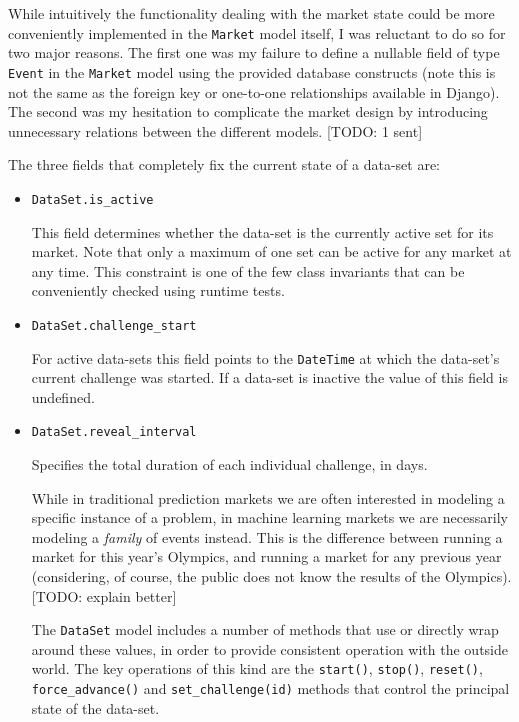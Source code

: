 \documentclass[bsc,frontabs,twoside,singlespacing,parskip,deptreport]{infthesis}     %
\begin{document}
	While intuitively the functionality dealing with the market state could be more conveniently implemented in the {\tt Market} model itself, I was reluctant to do so for two major reasons. The first one was my failure to define a nullable field of type {\tt Event} in the {\tt Market} model using the provided database constructs (note this is not the same as the foreign key or one-to-one relationships available in Django). The second was my hesitation to complicate the market design by introducing unnecessary relations between the different models. [TODO: 1 sent]

	The three fields that completely fix the current state of a data-set are:
\begin{itemize}

\item {\tt DataSet.is\_active}

	This field determines whether the data-set is the currently active set for its market. Note that only a maximum of one set can be active for any market at any time. This constraint is one of the few class invariants that can be conveniently checked using runtime tests. 

\item {\tt DataSet.challenge\_start}

	For active data-sets this field points to the {\tt DateTime} at which the data-set's current challenge was started. If a data-set is inactive the value of this field is undefined. 

\item {\tt DataSet.reveal\_interval}

	Specifies the total duration of each individual challenge, in days. 

    While in traditional prediction markets we are often interested in modeling a specific instance of a problem, in machine learning markets we are necessarily modeling a {\em family} of events instead. This is the difference between running a market for this year’s Olympics, and running a market for any previous year (considering, of course, the public does not know the results of the Olympics). [TODO: explain better]

	The {\tt DataSet} model includes a number of methods that use or directly wrap around these values, in order to provide consistent operation with the outside world. The key operations of this kind are the {\tt start()}, {\tt stop()}, {\tt reset()}, {\tt force\_advance()} and {\tt set\_challenge(id)} methods that control the principal state of the data-set. 


\end{itemize}
\end{document}
